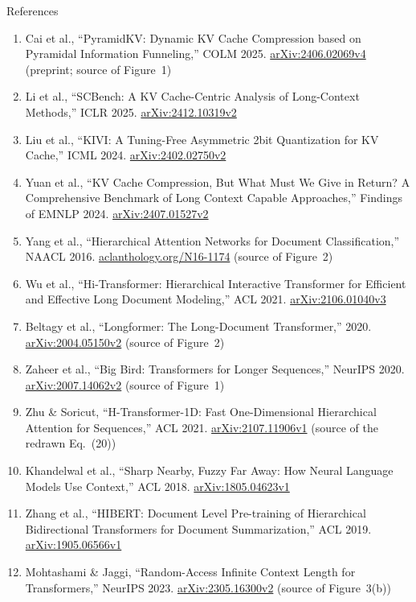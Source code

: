 \begin{frame}[allowframebreaks,t]{References}
\begin{enumerate}
    \item Cai et al., ``PyramidKV: Dynamic KV Cache Compression based on Pyramidal Information Funneling,'' COLM 2025. \href{https://arxiv.org/abs/2406.02069v4}{arXiv:2406.02069v4} (preprint; source of Figure~1)
    \item Li et al., ``SCBench: A KV Cache-Centric Analysis of Long-Context Methods,'' ICLR 2025. \href{https://arxiv.org/abs/2412.10319v2}{arXiv:2412.10319v2}
    \item Liu et al., ``KIVI: A Tuning-Free Asymmetric 2bit Quantization for KV Cache,'' ICML 2024. \href{https://arxiv.org/abs/2402.02750v2}{arXiv:2402.02750v2}
    \item Yuan et al., ``KV Cache Compression, But What Must We Give in Return? A Comprehensive Benchmark of Long Context Capable Approaches,'' Findings of EMNLP 2024. \href{https://arxiv.org/abs/2407.01527v2}{arXiv:2407.01527v2}
    \item Yang et al., ``Hierarchical Attention Networks for Document Classification,'' NAACL 2016. \href{https://aclanthology.org/N16-1174/}{aclanthology.org/N16-1174} (source of Figure~2)
    \item Wu et al., ``Hi-Transformer: Hierarchical Interactive Transformer for Efficient and Effective Long Document Modeling,'' ACL 2021. \href{https://arxiv.org/abs/2106.01040v3}{arXiv:2106.01040v3}
    \item Beltagy et al., ``Longformer: The Long-Document Transformer,'' 2020. \href{https://arxiv.org/abs/2004.05150v2}{arXiv:2004.05150v2} (source of Figure~2)
    \item Zaheer et al., ``Big Bird: Transformers for Longer Sequences,'' NeurIPS 2020. \href{https://arxiv.org/abs/2007.14062v2}{arXiv:2007.14062v2} (source of Figure~1)
    \item Zhu \& Soricut, ``H-Transformer-1D: Fast One-Dimensional Hierarchical Attention for Sequences,'' ACL 2021. \href{https://arxiv.org/abs/2107.11906v1}{arXiv:2107.11906v1} (source of the redrawn Eq.~(20))
    \item Khandelwal et al., ``Sharp Nearby, Fuzzy Far Away: How Neural Language Models Use Context,'' ACL 2018. \href{https://arxiv.org/abs/1805.04623v1}{arXiv:1805.04623v1}
    \item Zhang et al., ``HIBERT: Document Level Pre-training of Hierarchical Bidirectional Transformers for Document Summarization,'' ACL 2019. \href{https://arxiv.org/abs/1905.06566v1}{arXiv:1905.06566v1}
    \item Mohtashami \& Jaggi, ``Random-Access Infinite Context Length for Transformers,'' NeurIPS 2023. \href{https://arxiv.org/abs/2305.16300v2}{arXiv:2305.16300v2} (source of Figure~3(b))

\end{enumerate}
\end{frame}
